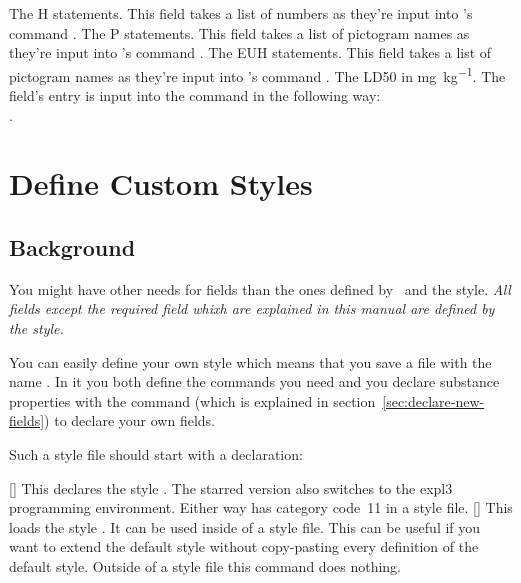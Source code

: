 \documentclass[load-preamble+]{cnltx-doc}
\begin{document}
\begin{options}
    The H statements. This field takes a list of numbers as they're input into
    's command .
    The P statements. This field takes a list of pictogram names as they're
    input into 's command .
    The EUH statements. This field takes a list of pictogram names as they're
    input into 's command .
    The \ac{LD50} in \si{\milli\gram\per\kilo\gram}. The field's entry is
    input into the  command  in the following way: \\
    .
\end{options}

\section{Define Custom Styles}\label{ssec:styles}
\subsection{Background}
You might have other needs for fields than the ones defined by \substances\
and the  style.  \emph{All fields except the required
  \option{name} field whixh are explained in this manual are defined by the
  \substyle{default} style.}

You can easily define your own style which means that you save a file with the
name \code{\substancesstyle{\meta{style}}}. In it you both define the commands
you need and you declare substance properties with the command
 (which is explained in
section~\ref{sec:declare-new-fields}) to declare your own fields.

Such a style file should start with a  declaration:
\begin{commands}
  [\sarg{}]
    This declares the style . The starred
    version also switches to the expl3 programming environment.  Either way
    \code{@} has category code~11 in a style file.
  []
    This loads the style . It can be used
    inside of a style file.  This can be useful if you want to extend the
    default style without copy-pasting every definition of the default style.
    Outside of a style file this command does nothing.
\end{commands}
\end{document}
